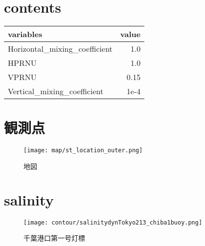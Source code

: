 \documentclass[12pt,a4paper]{jsarticle}
\begin{document}
\section{contents}
\begin{center}
  \begin{tabular}{lr} \toprule
    variables  & value \\ \midrule
    Horizontal\_mixing\_coefficient & 1.0 \\
    HPRNU & 1.0 \\
    VPRNU & 0.15 \\
    Vertical\_mixing\_coefficient & 1e-4 \\ \bottomrule
  \end{tabular}
\end{center}


\section{観測点}
\begin{figure}[hbtp]
  \texttt{[image: map/st\_location\_outer.png]}
  \caption{地図}
\end{figure}

\section{salinity}
\begin{figure}[hbtp]
    \texttt{[image: contour/salinitydynTokyo213\_chiba1buoy.png]}
    \caption{千葉港口第一号灯標}
\end{figure}
\end{document}
